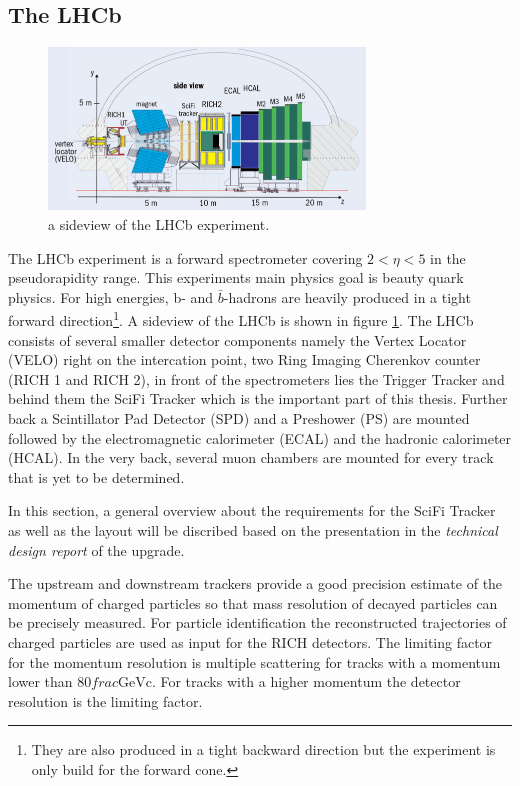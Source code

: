 \subsection{The LHCb}

\begin{figure}
  \centering
  \includegraphics[width=0.75\textwidth]{plots/LHCb_facility.jpg}
  \caption{a sideview of the LHCb experiment.}
  \label{fig:LHCb}
\end{figure}

The LHCb experiment\cite{lhcbInfo} is a forward spectrometer covering $2 \less \eta \less 5$ in the pseudorapidity range. This experiments main physics goal is beauty quark physics. For high energies, b- and $\bar{b}$-hadrons are heavily produced in a tight forward direction\footnote{They are also produced in a tight backward direction but the experiment is only build for the forward cone.}. A sideview of the LHCb is shown in figure \ref{fig:LHCb}.
The LHCb consists of several smaller detector components namely the Vertex Locator (VELO) right on the intercation point, two Ring Imaging Cherenkov counter (RICH 1 and RICH 2), in front of the spectrometers lies the Trigger Tracker and behind them the SciFi Tracker which is the important part of this thesis. Further back a Scintillator Pad Detector (SPD) and a Preshower (PS) are mounted followed by the electromagnetic calorimeter (ECAL) and the hadronic calorimeter (HCAL). In the very back, several muon chambers are mounted for every track that is yet to be determined.

In this section, a general overview about the requirements for the SciFi Tracker as well as the layout will be discribed based on the presentation in the \textit{technical design report}\cite{scifiInfo} of the upgrade.

The upstream and downstream trackers provide a good precision estimate of the momentum of charged particles so that mass resolution of decayed particles can be precisely measured. %
For particle identification the reconstructed trajectories of charged particles are used as input for the RICH detectors.
The limiting factor for the momentum resolution is multiple scattering for tracks with a momentum lower than $\num{80}frac{\text{GeV}}{\text{c}}$. For tracks with a higher momentum the detector resolution is the limiting factor.

